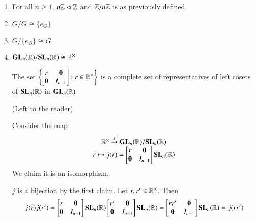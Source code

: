 \documentclass[12pt, a4paper, twoside, openright, titlepage]{book}
\begin{document}
\begin{eg}{}{}
        \leavevmode
        \begin{enumerate}
                \item For all $n \geq 1$, $n\mathbb Z \vartriangleleft \mathbb Z$ and $\mathbb Z/n\mathbb Z$ is as previously defined.
                \item $G/G \cong \{e_G\}$
                \item $G/\{e_G\} \cong G$
                \item $\mathbf{GL}_n(\mathbb R)/\mathbf{SL}_n(\mathbb R) \cong \mathbb R^{\times}$
                        \begin{claim}{}{}
                                The set $\left\{\begin{bmatrix} r & \mathbf{0} \\ \mathbf{0} & I_{n-1} \end{bmatrix} : r \in \mathbb R^{\times}\right\}$ is a complete set of representatives of left cosets of $\mathbf{SL}_n(\mathbb R)$ in $\mathbf{GL}_n(\mathbb R)$.
                        \end{claim}
                        \begin{proof*}{}{}
                                (Left to the reader)
                        \end{proof*}
                        Consider the map \begin{equation}
                                \begin{array}{c} \mathbb R^{\times}\xrightarrow{j} \mathbf{GL}_n(\mathbb R)/\mathbf{SL}_n(\mathbb R) \\ r\mapsto j(r) = \begin{bmatrix} r & \mathbf{0} \\ \mathbf{0} & I_{n-1} \end{bmatrix}\mathbf{SL}_n(\mathbb R) \end{array}
                        \end{equation}
                        We claim it is an isomorphism.
                        \begin{proof*}{}{}
                                $j$ is a bijection by the first claim. Let $r,r' \in \mathbb R^{\times}$. Then \begin{equation}
                                        j(r)j(r') = \begin{bmatrix} r & \mathbf{0} \\ \mathbf{0} & I_{n-1} \end{bmatrix}\SL_n(\R)\begin{bmatrix} r' & \mathbf{0} \\ \mathbf{0} & I_{n-1} \end{bmatrix}\SL_n(\R) = \begin{bmatrix} rr' & \mathbf{0} \\ \mathbf{0} & I_{n-1} \end{bmatrix}\SL_n(\R) = j(rr')

\end{equation}
\end{proof*}
\end{enumerate}
\end{eg}
\end{document}
